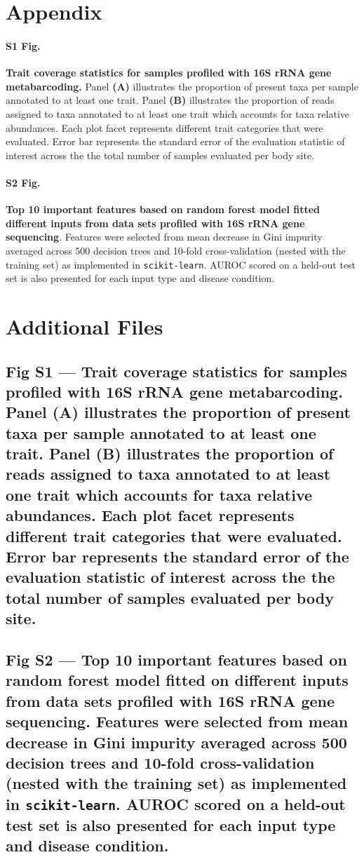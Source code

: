\section*{Appendix}
\paragraph*{S1 Fig.}
\label{S1_Fig}
{\bf Trait coverage statistics for samples profiled with 16S rRNA gene metabarcoding.} Panel \textbf{(A)} illustrates the proportion of present taxa per sample annotated to at least one trait. Panel \textbf{(B)} illustrates the proportion of reads assigned to taxa annotated to at least one trait which accounts for taxa relative abundances. Each plot facet represents different trait categories that were evaluated. Error bar represents the standard error of the evaluation statistic of interest across the the total number of samples evaluated per body site.

\paragraph*{S2 Fig.}
\label{S2_Fig}
{\bf Top 10 important features based on random forest model fitted different inputs from data sets profiled with 16S rRNA gene sequencing}. Features were selected from mean decrease in Gini impurity averaged across 500 decision trees and 10-fold cross-validation (nested with the training set) as implemented in \texttt{scikit-learn}. AUROC scored on a held-out test set is also presented for each input type and disease condition.


\section*{Additional Files}
  \subsection*{Fig S1 --- \textbf{Trait coverage statistics for samples profiled with 16S rRNA gene metabarcoding}. Panel \textbf{(A)} illustrates the proportion of present taxa per sample annotated to at least one trait. Panel \textbf{(B)} illustrates the proportion of reads assigned to taxa annotated to at least one trait which accounts for taxa relative abundances. Each plot facet represents different trait categories that were evaluated. Error bar represents the standard error of the evaluation statistic of interest across the the total number of samples evaluated per body site.}
  \subsection*{Fig S2 --- \textbf{Top 10 important features based on random forest model fitted on different inputs from data sets profiled with 16S rRNA gene sequencing}.  Features were selected from mean decrease in Gini impurity averaged across 500 decision trees and 10-fold cross-validation (nested with the training set) as implemented in \texttt{scikit-learn}. AUROC scored on a held-out test set is also presented for each input type and disease condition.}